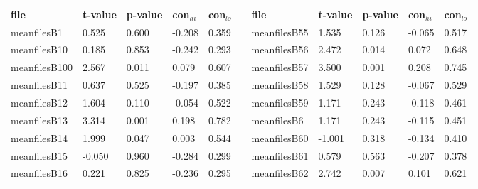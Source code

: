 \begin{table}[h!]
\small
\begin{tabular}{lllllllllll}
\textbf{file} & \textbf{t-value} & \textbf{p-value} & \textbf{con$_{hi}$} & \textbf{con$_{lo}$} & \textbf{} & \textbf{file} & \textbf{t-value} & \textbf{p-value} & \textbf{con$_{hi}$} & \textbf{con$_{lo}$} \\ \cline{1-5} \cline{7-11} 
meanfilesB1   & 0.525            & 0.600            & -0.208              & 0.359               &           & meanfilesB55  & 1.535            & 0.126            & -0.065              & 0.517               \\
meanfilesB10  & 0.185            & 0.853            & -0.242              & 0.293               &           & meanfilesB56  & 2.472            & 0.014            & 0.072               & 0.648               \\
meanfilesB100 & 2.567            & 0.011            & 0.079               & 0.607               &           & meanfilesB57  & 3.500            & 0.001            & 0.208               & 0.745               \\
meanfilesB11  & 0.637            & 0.525            & -0.197              & 0.385               &           & meanfilesB58  & 1.529            & 0.128            & -0.067              & 0.529               \\
meanfilesB12  & 1.604            & 0.110            & -0.054              & 0.522               &           & meanfilesB59  & 1.171            & 0.243            & -0.118              & 0.461               \\
meanfilesB13  & 3.314            & 0.001            & 0.198               & 0.782               &           & meanfilesB6   & 1.171            & 0.243            & -0.115              & 0.451               \\
meanfilesB14  & 1.999            & 0.047            & 0.003               & 0.544               &           & meanfilesB60  & -1.001           & 0.318            & -0.134              & 0.410               \\
meanfilesB15  & -0.050           & 0.960            & -0.284              & 0.299               &           & meanfilesB61  & 0.579            & 0.563            & -0.207              & 0.378               \\
meanfilesB16  & 0.221            & 0.825            & -0.236              & 0.295               &           & meanfilesB62  & 2.742            & 0.007            & 0.101               & 0.621               \\

\end{tabular}
\end{table}

